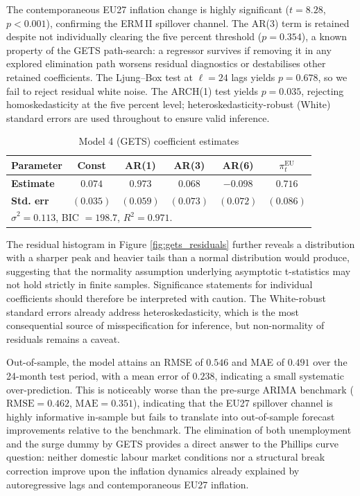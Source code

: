 The contemporaneous EU27 inflation change is highly significant ($t = 8.28$, $p < 0.001$), confirming the ERM\,II spillover channel. The AR(3) term is retained despite not individually clearing the five percent threshold ($p = 0.354$), a known property of the GETS path-search: a regressor survives if removing it in any explored elimination path worsens residual diagnostics or destabilises other retained coefficients. The Ljung--Box test at $\ell = 24$ lags yields $p = 0.678$, so we fail to reject residual white noise. The ARCH(1) test yields $p = 0.035$, rejecting homoskedasticity at the five percent level; heteroskedasticity-robust (White) standard errors are used throughout to ensure valid inference.

\begin{table}[H]
\centering
\caption{Model 4 (GETS) coefficient estimates}
\small{
\begin{tabular*}{\textwidth}{@{\extracolsep{\fill}}lccccc}
\hline \hline
\rule{0pt}{12pt}\textbf{Parameter} & Const & AR(1) & AR(3) & AR(6) &
$\pi^{\text{EU}}_{t}$ \\[4pt]
\hline
\rule{0pt}{12pt}\textbf{Estimate} & $0.074$ & $0.973$ & $0.068$ & $-0.098$ &
$0.716$ \\[4pt]
\textbf{Std. err} & $(0.035)$ & $(0.059)$ & $(0.073)$ & $(0.072)$ &
$(0.086)$ \\[4pt]
\hline \hline
\multicolumn{6}{l}{\rule{0pt}{12pt}\footnotesize $\hat{\sigma}^2 = 0.113$,\;
BIC $= 198.7$,\; $R^2 = 0.971$.}
\end{tabular*}
}
\label{tab:model4_coef}
\end{table}



The residual histogram in Figure \ref{fig:gets_residuals} further reveals a distribution with a sharper peak and heavier tails than a normal distribution would produce, suggesting that the normality assumption underlying asymptotic t-statistics may not hold strictly in finite samples. Significance statements for individual coefficients should therefore be interpreted with caution. The White-robust standard errors already address heteroskedasticity, which is the most consequential source of misspecification for inference, but non-normality of residuals remains a caveat.

Out-of-sample, the model attains an RMSE of $0.546$ and MAE of $0.491$ over the 24-month test period, with a mean error of $0.238$, indicating a small systematic over-prediction. This is noticeably worse than the pre-surge ARIMA benchmark ($\text{RMSE} = 0.462$, $\text{MAE} = 0.351$), indicating that the EU27 spillover channel is highly informative in-sample but fails to translate into out-of-sample forecast improvements relative to the benchmark. The elimination of both unemployment and the surge dummy by GETS provides a direct answer to the Phillips curve question: neither domestic labour market conditions nor a structural break correction improve upon the inflation dynamics already explained by autoregressive lags and contemporaneous EU27 inflation.



